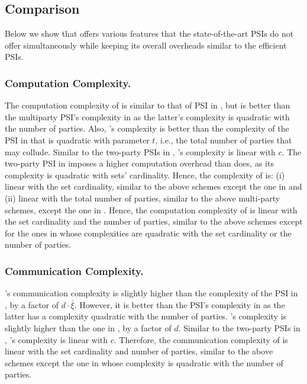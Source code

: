 \vs
\vs

\subsection{Comparison}
Below we show that \epsi offers various features that the state-of-the-art PSIs do not offer simultaneously while keeping its overall overheads similar to the efficient PSIs.  

\vs
\vs

\subsubsection{Computation Complexity.} The  computation complexity  of \epsi is similar to that of PSI in \cite{AbadiDMT22}, but is better than the multiparty PSI's complexity in \cite{DBLP:conf/ccs/KolesnikovMPRT17} as  the latter's complexity is quadratic with the number of parties. Also, \epsi's complexity  is better than the complexity of the PSI in  \cite{NevoTY21}  that is quadratic with parameter $t$, i.e., the total number of parties that may collude. Similar to the two-party PSIs in \cite{DebnathD16,RaghuramanR22}, \epsi's complexity is linear with $c$.  The two-party PSI in \cite{DBLP:conf/dbsec/DongCCR13} imposes a higher computation overhead than \epsi does, as its complexity is quadratic with sets' cardinality. Hence, the complexity of \epsi is: (i) linear with the set cardinality, similar to the above schemes except the one in \cite{DBLP:conf/dbsec/DongCCR13} and (ii) linear with the total number of parties, similar to  the above multi-party schemes, except the one in \cite{DBLP:conf/ccs/KolesnikovMPRT17}. 
%
Hence, the computation complexity of \epsi is linear with the set cardinality and the number of parties, similar to the above schemes except for the ones in \cite{DBLP:conf/ccs/KolesnikovMPRT17,DBLP:conf/dbsec/DongCCR13} whose complexities are quadratic with the set cardinality or the number of parties. 

\vs
\vs


\subsubsection{Communication Complexity.}  \epsi's communication complexity is slightly higher than the complexity of the PSI in \cite{AbadiDMT22}, by a factor of $d\cdot \bar\xi$. However, it is better than the  PSI's complexity in \cite{DBLP:conf/ccs/KolesnikovMPRT17} as the latter has a complexity quadratic with the number of parties. \epsi's complexity is slightly higher than the one in \cite{NevoTY21}, by a factor of $d$. Similar to the two-party PSIs in  \cite{DebnathD16,RaghuramanR22,DBLP:conf/dbsec/DongCCR13}, \epsi's complexity is linear with $c$. 
%
Therefore, the communication complexity of \epsi is linear with the set cardinality and number of parties, similar to the above schemes except the one in \cite{DBLP:conf/ccs/KolesnikovMPRT17} whose complexity is quadratic with the number of parties. 

